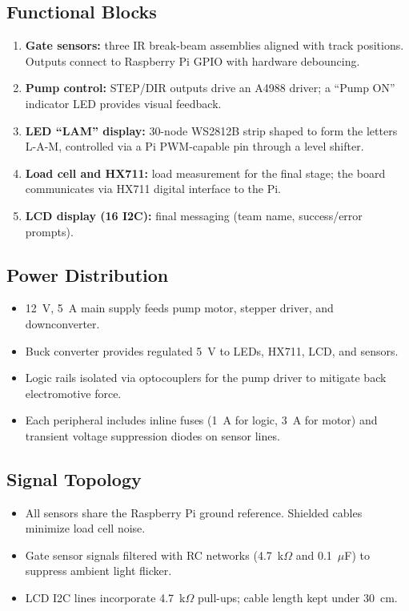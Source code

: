 \documentclass[12pt]{article}
\begin{document}
\subsection{Functional Blocks}
\begin{enumerate}
    \item \textbf{Gate sensors:} three IR break-beam assemblies aligned with track positions. Outputs connect to Raspberry Pi GPIO with hardware debouncing.
    \item \textbf{Pump control:} STEP/DIR outputs drive an A4988 driver; a ``Pump ON'' indicator LED provides visual feedback.
    \item \textbf{LED ``LAM'' display:} 30-node WS2812B strip shaped to form the letters L-A-M, controlled via a Pi PWM-capable pin through a level shifter.
    \item \textbf{Load cell and HX711:} load measurement for the final stage; the board communicates via HX711 digital interface to the Pi.
    \item \textbf{LCD display (16 I2C):} final messaging (team name, success/error prompts).
\end{enumerate}

\subsection{Power Distribution}
\begin{itemize}
    \item 12~V, 5~A main supply feeds pump motor, stepper driver, and downconverter.
    \item Buck converter provides regulated 5~V to LEDs, HX711, LCD, and sensors.
    \item Logic rails isolated via optocouplers for the pump driver to mitigate back electromotive force.
    \item Each peripheral includes inline fuses (1~A for logic, 3~A for motor) and transient voltage suppression diodes on sensor lines.
\end{itemize}

\subsection{Signal Topology}
\begin{itemize}
    \item All sensors share the Raspberry Pi ground reference. Shielded cables minimize load cell noise.
    \item Gate sensor signals filtered with RC networks (4.7~k\ensuremath{\Omega} and 0.1~\ensuremath{\mu}F) to suppress ambient light flicker.
    \item LCD I2C lines incorporate 4.7~k\ensuremath{\Omega} pull-ups; cable length kept under 30~cm.
\end{itemize}
\end{document}
